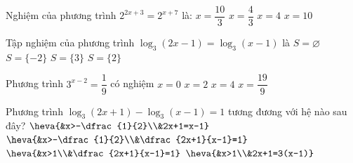 \begin{ex}%
	Nghiệm của phương trình  $2^{2x+3}=2^{x+7}$ là:
	\choice 
		 {$x=\dfrac{10}{3}$}
		{$x=\dfrac{4}{3}$} 
		 {\True $x=4$}
		 {$x=10$}
\end{ex}

\begin{ex}%
	Tập nghiệm của phương trình $\log _{3}(2x-1)=\log _{3}(x-1)$  là
	\choice 
		{$S=\varnothing$} 
		{$S=\{-2\}$} 
		{$S=\{3\}$} 
		{\True $S=\{2\}$} 
\end{ex}

\begin{ex}%
	Phương trình $3^{x-2}=\dfrac{1}{9}$ có  nghiệm
	 \choice
		{\True $x=0$} 
		{$x=2$} 
		{$x=4$} 
		{$x=\dfrac{19}{9}$} 
\end{ex}

\begin{ex}%
	Phương trình $\log _{3}(2x+1)-\log _{3}(x-1)=1$  tương đương với hệ nào sau đây?
	 \choice
		 {$\heva{&x>-\dfrac{1}{2}\\&2x+1=x-1}$}
		 {$\heva{&x>-\dfrac{1}{2}\\&\dfrac{2x+1}{x-1}=1}$}
		{$\heva{&x>1\\&\dfrac{2x+1}{x-1}=1}$} 
		{\True  $\heva{&x>1\\&2x+1=3(x-1)}$}
\end{ex}

